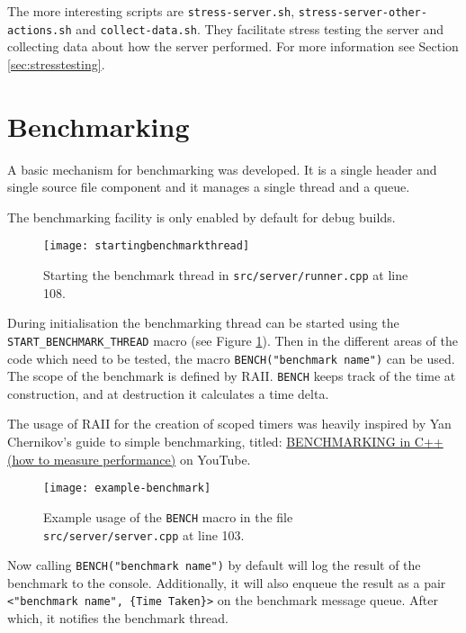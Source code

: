 \documentclass[article]{uom-coursework}
\begin{document}
The more interesting scripts are \texttt{stress-server.sh},
\texttt{stress-server-other-actions.sh} and
\texttt{collect-data.sh}. They facilitate stress testing the
server and collecting data about how the server performed. For
more information see Section \ref{sec:stresstesting}.

\section{Benchmarking}

A basic mechanism for benchmarking was developed. It is a single
header and single source file component and it manages a single
thread and a queue.

\begin{noteline}
    The benchmarking facility is only enabled by default for
    debug builds.
\end{noteline}

\begin{figure}[H]
\centering
\texttt{[image: startingbenchmarkthread]}
\caption{Starting the benchmark thread in
\texttt{src/server/runner.cpp} at line 108.}
\label{fig:startingbenchmarkthread}
\end{figure}

During initialisation the benchmarking thread can be started
using the \texttt{START\_BENCHMARK\_THREAD} macro (see Figure
\ref{fig:startingbenchmarkthread}). Then in the different areas
of the code which need to be tested, the macro
\texttt{BENCH("benchmark name")} can be used. The scope of the
benchmark is defined by RAII. \texttt{BENCH} keeps track of the
time at construction, and at destruction it calculates a time
delta.

\begin{attrib}
    The usage of RAII for the creation of scoped timers was
    heavily inspired by Yan Chernikov's guide to simple
    benchmarking, titled:
    \href{https://www.youtube.com/watch?v=YG4jexlSAjc}{BENCHMARKING
    in C++ (how to measure performance)} on YouTube.
\end{attrib}

\begin{figure}[H]
\centering
\texttt{[image: example-benchmark]}
\caption{Example usage of the \texttt{BENCH} macro in the file
\texttt{src/server/server.cpp} at line 103.}
\label{fig:examplebenchmark}
\end{figure}

Now calling \texttt{BENCH("benchmark name")} by default will log
the result of the benchmark to the console. Additionally, it
will also enqueue the result as a pair \texttt{<"benchmark
name", \{Time Taken\}>} on the benchmark message queue. After
which, it notifies the benchmark thread.
\end{document}
